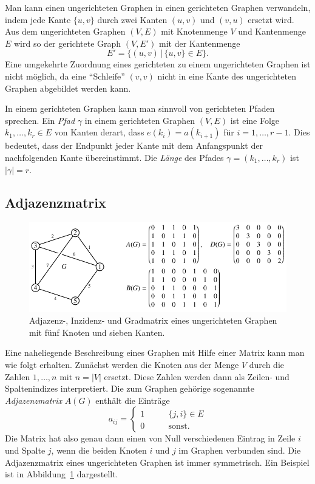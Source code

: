 Man kann einen ungerichteten Graphen in einen gerichteten Graphen
verwandeln, indem jede Kante $\{u,v\}$ durch zwei Kanten 
$(u,v)$ und $(v,u)$ ersetzt wird.
Aus dem ungerichteten Graphen $(V,E)$ mit Knotenmenge $V$ und Kantenmenge
$E$ wird so der gerichtete Graph
$(V,E')$ mit der Kantenmenge
\begin{equation*}
E' 
=
\{
(u,v)
\,|\,
\{u,v\}\in E
\}.
\end{equation*}
Eine umgekehrte Zuordnung eines gerichteten zu einem ungerichteten
Graphen ist nicht möglich, da eine ``Schleife'' $(v,v)$ nicht in eine Kante
des ungerichteten Graphen abgebildet werden kann.

In einem gerichteten Graphen kann man sinnvoll von gerichteten Pfaden
sprechen.
%
Ein {\em Pfad} $\gamma$ in einem gerichteten Graphen $(V,E)$ ist eine Folge
$k_1,\dots,k_r\in E$ von Kanten derart, dass $e(k_i) = a(k_{i+1})$
für $i=1,\dots,r-1$.
Dies bedeutet, dass der Endpunkt jeder Kante mit dem Anfangspunkt der
nachfolgenden Kante übereinstimmt.
Die {\em Länge} des Pfades $\gamma=(k_1,\dots,k_r)$ ist $|\gamma|=r$.

\subsection{Adjazenzmatrix}
\begin{figure}
\centering
\includegraphics{chapters/70-graphen/images/adjazenzu.pdf}
\caption{Adjazenz-, Inzidenz- und Gradmatrix eines ungerichteten
Graphen mit fünf Knoten und sieben Kanten.
\label{buch:graphen:fig:adjazenzu}}
\end{figure}
Eine naheliegende Beschreibung eines Graphen mit Hilfe einer
Matrix kann man wie folgt erhalten.
Zunächst werden die Knoten aus der Menge $V$ durch die Zahlen
$1,\dots,n$ mit $n=|V|$ ersetzt.
Diese Zahlen werden dann als Zeilen- und Spaltenindizes interpretiert.
Die zum Graphen gehörige sogenannte {\em Adjazenzmatrix} $A(G)$
enthält die Einträge
\begin{equation}
a_{i\!j}
=
\begin{cases}
1&\qquad  \{j,i\} \in E\\
0&\qquad  \text{sonst.}
\end{cases}
\label{buch:graphen:eqn:adjazenzmatrix}
\end{equation}
Die Matrix hat also genau dann einen von Null verschiedenen Eintrag
in Zeile $i$ und Spalte $j$, wenn die beiden Knoten $i$ und $j$
im Graphen verbunden sind.
Die Adjazenzmatrix eines ungerichteten Graphen ist immer symmetrisch.
Ein Beispiel ist in Abbildung~\ref{buch:graphen:fig:adjazenzu}
dargestellt.

